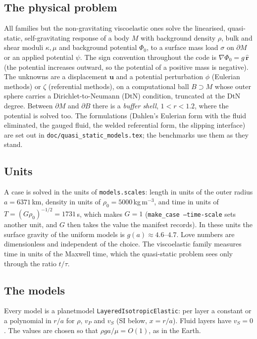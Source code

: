 \documentclass[11pt]{article}
\numberwithin{equation}{section}
\newcommand{\vu}{\mathbf{u}}
\newcommand{\rhat}{\hat{\mathbf{r}}}
\newcommand{\code}[1]{\texttt{#1}}
\begin{document}
\subsection{The physical problem}

All families but the non-gravitating viscoelastic ones solve the
linearised, quasi-static, self-gravitating response of a body $M$ with
background density $\rho$, bulk and shear moduli $\kappa,\mu$ and
background potential $\Phi_0$, to a surface mass load $\sigma$ on
$\partial M$ or an applied potential $\psi$. The sign convention throughout
the code is $\nabla\Phi_0 = g\,\rhat$ (the potential increases outward, so
the potential of a positive mass is negative). The unknowns are a
displacement $\vu$ and a potential perturbation $\phi$ (Eulerian methods)
or $\zeta$ (referential methods), on a computational ball $B\supset M$
whose outer sphere carries a Dirichlet-to-Neumann (DtN) condition,
truncated at the DtN degree. Between $\partial M$ and $\partial B$ there is
a \emph{buffer shell}, $1<r<1.2$, where the potential is solved too. The
formulations (Dahlen's Eulerian form with the fluid eliminated, the gauged
fluid, the welded referential form, the slipping interface) are set out in
\code{doc/quasi\_static\_models.tex}; the benchmarks use them as they
stand.

\subsection{Units}
\label{sec:units}

A case is solved in the units of \code{models.scales}: length in units of
the outer radius $a=6371$\,km, density in units of
$\rho_0=5000$\,kg\,m$^{-3}$, and time in units of
$T=(G\rho_0)^{-1/2}=1731$\,s, which makes $G=1$ (\code{make\_case
--time-scale} sets another unit, and $G$ then takes the value the manifest
records). In these units the surface gravity of the uniform models is
$g(a)\approx 4.6$--$4.7$. Love numbers are dimensionless and independent
of the choice. The viscoelastic family measures time in units of the
Maxwell time, which the quasi-static problem sees only through the ratio
$t/\tau$.

\subsection{The models}
\label{sec:models}

Every model is a planetmodel \code{LayeredIsotropicElastic}: per layer a
constant or a polynomial in $r/a$ for $\rho$, $v_P$ and $v_S$ (SI below,
$x=r/a$). Fluid layers have $v_S=0$. The values are chosen so that
$\rho g a/\mu=O(1)$, as in the Earth.
\end{document}
